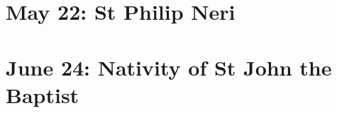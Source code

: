 {{\section{May 22: St Philip Neri}
\subtitle{ Class (proper to the Oratory)}
\subtitle{I \& II Vespers}

\def\definevesperspropers{
}
\def\definevesperspropersalt{
}
\def\vesperspropersnote{At II Vespers:}
\def\vesperspropersaltnote{At I Vespers:}
\def\premagverses{\greseteolcustos{manual}}

\medskip
{}
}

{
\section{June 24: Nativity of St John the Baptist}
\subtitle{ Class}
\subtitle{I \& II Vespers}

\def\definevesperspropers{
  \def\prepsalmfive{\greseteolcustos{manual}}
}
\def\definevesperspropersalt{}
\def\vesperspropersnote{At II Vespers:}
\def\vesperspropersaltnote{At I Vespers:}
\def\prevesperspsalms{\noindent\printnote{Chapter and following, page \pageref{june24-chapter}.\\}}
\def\vesperspsalmslabel{\label{june24-2vespers}}
\def\prevesperspsalmsalt{\noindent\printnote{II Vespers psalms and antiphons, page \pageref{june24-2vespers}.}\medskip}
\def\prechapter{\label{june24-chapter}}
\def\premagverses{\greseteolcustos{manual}}

}}
